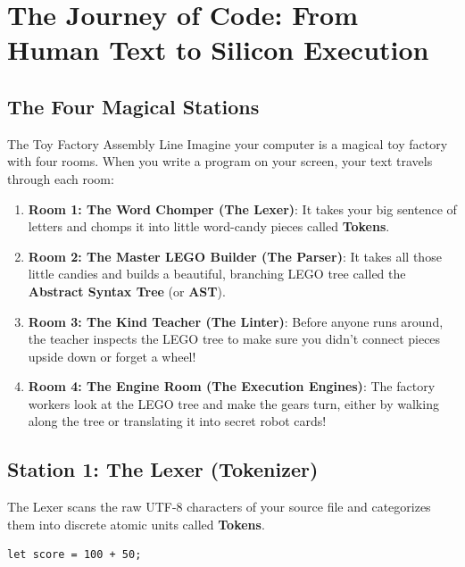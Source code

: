 \chapter{The Journey of Code: From Human Text to Silicon Execution}

\section{The Four Magical Stations}

\begin{kidbox}{The Toy Factory Assembly Line}
Imagine your computer is a magical toy factory with four rooms. When you write a program on your screen, your text travels through each room:
\begin{enumerate}
    \item \textbf{Room 1: The Word Chomper (The Lexer)}: It takes your big sentence of letters and chomps it into little word-candy pieces called \textbf{Tokens}.
    \item \textbf{Room 2: The Master LEGO Builder (The Parser)}: It takes all those little candies and builds a beautiful, branching LEGO tree called the \textbf{Abstract Syntax Tree} (or \textbf{AST}).
    \item \textbf{Room 3: The Kind Teacher (The Linter)}: Before anyone runs around, the teacher inspects the LEGO tree to make sure you didn't connect pieces upside down or forget a wheel!
    \item \textbf{Room 4: The Engine Room (The Execution Engines)}: The factory workers look at the LEGO tree and make the gears turn, either by walking along the tree or translating it into secret robot cards!
\end{enumerate}
\end{kidbox}

\section{Station 1: The Lexer (Tokenizer)}

The Lexer scans the raw UTF-8 characters of your source file and categorizes them into discrete atomic units called \textbf{Tokens}.

\begin{lstlisting}[language=shaelang]
let score = 100 + 50;
\end{lstlisting}

